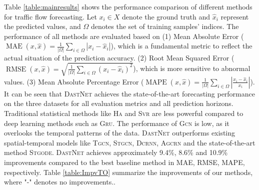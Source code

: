 \documentclass[sigconf]{acmart}
\theoremstyle{definition}
\begin{document}
Table \ref{table:mainresults} shows the performance comparison of different methods for traffic flow forecasting. Let $x_{i} \in {X}$ denote the ground truth and $\hat{x}_{i}$ represent the predicted values, and $\Omega$ denotes the set of training samples' indices. The performance of all methods are evaluated based on (1) Mean Absolute Error ($\operatorname{MAE}(x, \hat{x})=\frac{1}{|\Omega|} \sum_{i \in \Omega}\left|x_{i}-\hat{x}_{i}\right|$), which is a fundamental metric to reflect the actual situation of the prediction accuracy. (2) Root Mean Squared Error ($\operatorname{RMSE}(x, \hat{x})=\sqrt{\frac{1}{|\Omega|} \sum_{i \in \Omega}\left(x_{i}-\hat{x}_{i}\right)^{2}}$), which is more sensitive to abnormal values. (3) Mean Absolute Percentage Error ($\operatorname{MAPE}(x, \hat{x})=\frac{1}{|\Omega|} \sum_{i \in \Omega}\left|\frac{x_{i}-\hat{x}_{i}}{x_{i}}\right|$). It can be seen that \textsc{DastNet} achieves the state-of-the-art forecasting performance on the three datasets for all evaluation metrics and all prediction horizons. Traditional statistical methods like \textsc{Ha} and \textsc{Svr} are less powerful compared to deep learning methods such as \textsc{Gru}. 
The performance of \textsc{Gcn} is low, as it overlooks the temporal patterns of the data. 
\textsc{DastNet} outperforms existing spatial-temporal models like \textsc{Tgcn}, \textsc{Stgcn}, \textsc{Dcrnn}, \textsc{Agcrn} and the state-of-the-art method \textsc{Stgode}. \textsc{DastNet} achieves approximately 9.4\%, 8.6\% and 10.9\% improvements compared to the best baseline method in MAE, RMSE, MAPE, respectively. Table \ref{table:ImpvTO} summarize the improvements of our methods, where "-" denotes no improvements.. 
\end{document}
